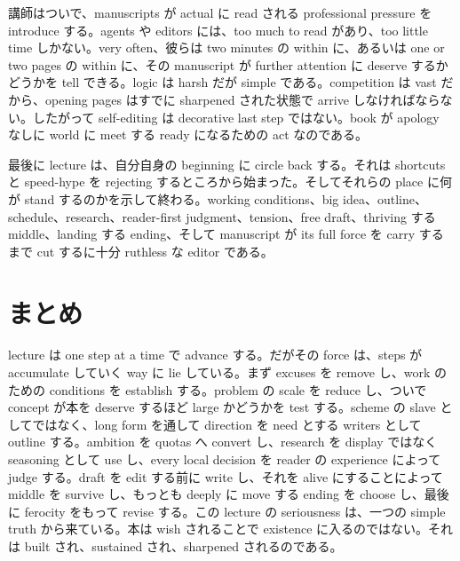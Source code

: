 講師はついで、manuscripts が actual に read される professional pressure を introduce する。agents や editors には、too much to read があり、too little time しかない。very often、彼らは two minutes の within に、あるいは one or two pages の within に、その manuscript が further attention に deserve するかどうかを tell できる。logic は harsh だが simple である。competition は vast だから、opening pages はすでに sharpened された状態で arrive しなければならない。したがって self-editing は decorative last step ではない。book が apology なしに world に meet する ready になるための act なのである。

最後に lecture は、自分自身の beginning に circle back する。それは shortcuts と speed-hype を rejecting するところから始まった。そしてそれらの place に何が stand するのかを示して終わる。working conditions、big idea、outline、schedule、research、reader-first judgment、tension、free draft、thriving する middle、landing する ending、そして manuscript が its full force を carry するまで cut するに十分 ruthless な editor である。

\section{まとめ}

lecture は one step at a time で advance する。だがその force は、steps が accumulate していく way に lie している。まず excuses を remove し、work のための conditions を establish する。problem の scale を reduce し、ついで concept が本を deserve するほど large かどうかを test する。scheme の slave としてではなく、long form を通して direction を need とする writers として outline する。ambition を quotas へ convert し、research を display ではなく seasoning として use し、every local decision を reader の experience によって judge する。draft を edit する前に write し、それを alive にすることによって middle を survive し、もっとも deeply に move する ending を choose し、最後に ferocity をもって revise する。この lecture の seriousness は、一つの simple truth から来ている。本は wish されることで existence に入るのではない。それは built され、sustained され、sharpened されるのである。